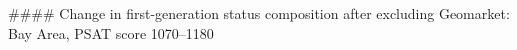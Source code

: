 #### Change in first-generation status composition after excluding Geomarket: Bay Area, PSAT score 1070–1180
